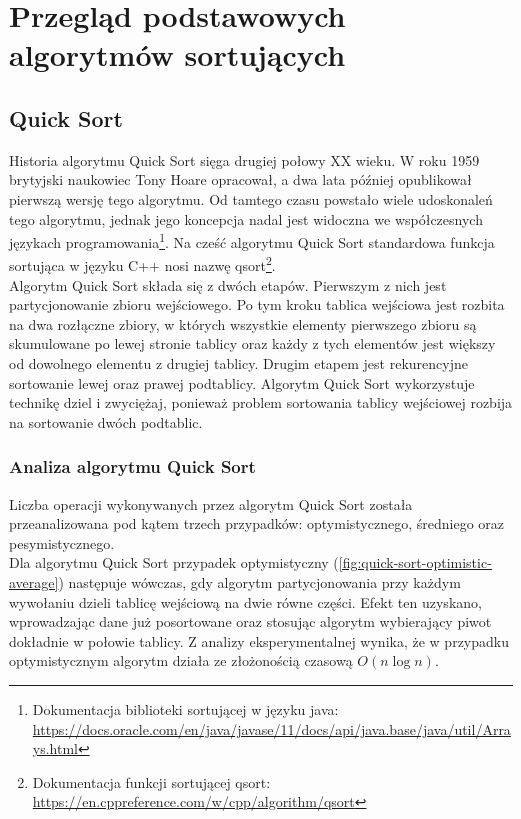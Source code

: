 \chapter{Przegląd podstawowych algorytmów sortujących}
\thispagestyle{chapterBeginStyle}


\section{Quick Sort}


Historia algorytmu Quick Sort sięga drugiej połowy XX wieku. W roku 1959 brytyjski naukowiec Tony Hoare
opracował, a dwa lata później opublikował pierwszą wersję tego algorytmu. Od tamtego czasu powstało wiele
udoskonaleń tego algorytmu, jednak jego koncepcja nadal jest widoczna we współczesnych językach programowania\footnote{Dokumentacja biblioteki sortującej w języku java: \url{https://docs.oracle.com/en/java/javase/11/docs/api/java.base/java/util/Arrays.html}}.
Na cześć algorytmu Quick Sort standardowa funkcja sortująca w języku C++ nosi nazwę qsort\footnote{Dokumentacja funkcji sortującej qsort:
\url{https://en.cppreference.com/w/cpp/algorithm/qsort}}.\\

Algorytm Quick Sort składa się z dwóch etapów. Pierwszym z nich jest partycjonowanie zbioru wejściowego.
Po tym kroku tablica wejściowa jest rozbita na dwa rozłączne zbiory, w których wszystkie elementy pierwszego
zbioru są skumulowane po lewej stronie tablicy oraz każdy z tych elementów jest większy od dowolnego elementu
z drugiej tablicy. Drugim etapem jest rekurencyjne sortowanie lewej oraz prawej podtablicy.
Algorytm Quick Sort wykorzystuje technikę dziel i zwyciężaj, ponieważ problem sortowania tablicy wejściowej
rozbija na sortowanie dwóch podtablic.


\subsection{Analiza algorytmu Quick Sort}

Liczba operacji wykonywanych przez algorytm Quick Sort została przeanalizowana pod kątem trzech przypadków:
optymistycznego, średniego oraz pesymistycznego.\\

Dla algorytmu Quick Sort przypadek optymistyczny (\ref{fig:quick-sort-optimistic-average}) następuje wówczas, gdy algorytm partycjonowania przy każdym wywołaniu dzieli tablicę wejściową na dwie równe części. Efekt ten uzyskano, wprowadzając dane już posortowane oraz stosując algorytm wybierający piwot dokładnie w połowie tablicy. Z analizy eksperymentalnej wynika, że w przypadku optymistycznym algorytm działa ze złożonością czasową $O(n\log{}n)$.\\

